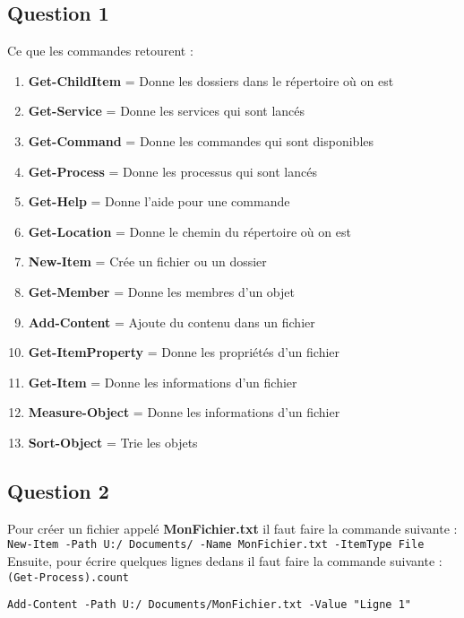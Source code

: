 \documentclass[12pt, a4paper]{article}
\begin{document}
\subsection{Question 1}
Ce que les commandes retourent :\\
\begin{enumerate}
    \item \textbf{Get-ChildItem} = Donne les dossiers dans le répertoire où on est 
    \item \textbf{Get-Service} = Donne les services qui sont lancés
    \item \textbf{Get-Command} = Donne les commandes qui sont disponibles
    \item \textbf{Get-Process} = Donne les processus qui sont lancés
    \item \textbf{Get-Help} = Donne l'aide pour une commande
    \item \textbf{Get-Location} = Donne le chemin du répertoire où on est
    \item \textbf{New-Item} = Crée un fichier ou un dossier
    \item \textbf{Get-Member} = Donne les membres d'un objet
    \item \textbf{Add-Content} = Ajoute du contenu dans un fichier
    \item \textbf{Get-ItemProperty} = Donne les propriétés d'un fichier
    \item \textbf{Get-Item} = Donne les informations d'un fichier
    \item \textbf{Measure-Object} = Donne les informations d'un fichier
    \item \textbf{Sort-Object} = Trie les objets
\end{enumerate}

\subsection{Question 2}
Pour créer un fichier appelé \textbf{MonFichier.txt} il faut faire la commande
suivante : \texttt{New-Item -Path U:/ Documents/ -Name MonFichier.txt -ItemType File}\\

Ensuite, pour écrire quelques lignes dedans il faut faire la commande suivante :\\

\texttt{(Get-Process).count}

\texttt{Add-Content -Path U:/ Documents/MonFichier.txt -Value "Ligne 1"}\\
\end{document}
